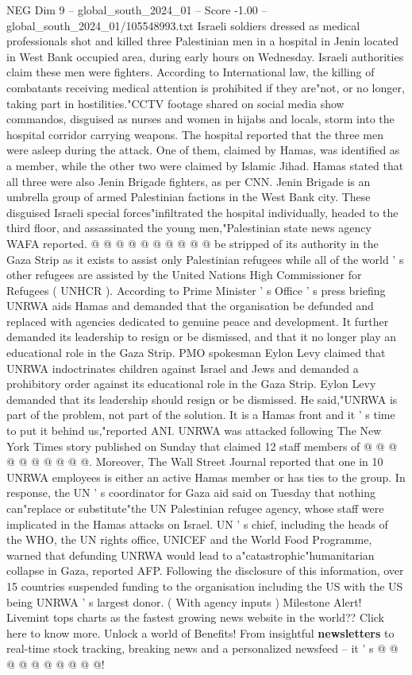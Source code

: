 \begin{textsample}{NEG Dim 9 – global\_south\_2024\_01 – Score -1.00 – global\_south\_2024\_01/105548993.txt}  \label{ex:f9_neg_394}
Israeli soldiers dressed as medical professionals shot and killed three Palestinian men in a hospital in Jenin located in West Bank occupied area, during early hours on Wednesday.
Israeli authorities claim these men were fighters.
According to International law, the killing of combatants receiving medical attention is prohibited if they are"not, or no longer, taking part in hostilities."CCTV footage shared on social media show commandos, disguised as nurses and women in hijabs and locals, storm into the hospital corridor carrying weapons.
The hospital reported that the three men were asleep during the attack.
One of them, claimed by Hamas, was identified as a member, while the other two were claimed by Islamic Jihad.
Hamas stated that all three were also Jenin Brigade fighters, as per CNN.
Jenin Brigade is an umbrella group of armed Palestinian factions in the West Bank city.
These disguised Israeli special forces"infiltrated the hospital individually, headed to the third floor, and assassinated the young men,"Palestinian state news agency WAFA reported. @ @ @ @ @ @ @ @ @ @ be stripped of its authority in the Gaza Strip as it exists to assist only Palestinian refugees while all of the world ' s other refugees are assisted by the United Nations High Commissioner for Refugees ( UNHCR ).
According to Prime Minister ' s Office ' s press briefing UNRWA aids Hamas and demanded that the organisation be defunded and replaced with agencies dedicated to genuine peace and development.
It further demanded its leadership to resign or be dismissed, and that it no longer play an educational role in the Gaza Strip.
PMO spokesman Eylon Levy claimed that UNRWA indoctrinates children against Israel and Jews and demanded a prohibitory order against its educational role in the Gaza Strip.
Eylon Levy demanded that its leadership should resign or be dismissed.
He said,"UNRWA is part of the problem, not part of the solution.
It is a Hamas front and it ' s time to put it behind us,"reported ANI.
UNRWA was attacked following The New York Times story published on Sunday that claimed 12 staff members of @ @ @ @ @ @ @ @ @ @.
Moreover, The Wall Street Journal reported that one in 10 UNRWA employees is either an active Hamas member or has ties to the group.
In response, the UN ' s coordinator for Gaza aid said on Tuesday that nothing can"replace or substitute"the UN Palestinian refugee agency, whose staff were implicated in the Hamas attacks on Israel.
UN ' s chief, including the heads of the WHO, the UN rights office, UNICEF and the World Food Programme, warned that defunding UNRWA would lead to a"catastrophic"humanitarian collapse in Gaza, reported AFP.
Following the disclosure of this information, over 15 countries suspended funding to the organisation including the US with the US being UNRWA ' s largest donor. ( With agency inputs ) Milestone Alert!
Livemint tops charts as the fastest growing news website in the world??
Click here to know more.
Unlock a world of Benefits!
From insightful \textbf{newsletters} to real-time stock tracking, breaking news and a personalized newsfeed -- it ' s @ @ @ @ @ @ @ @ @ @!

\end{textsample}
